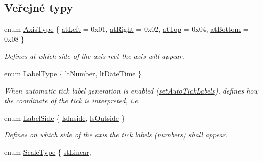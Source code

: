 \subsection*{Veřejné typy}
\begin{DoxyCompactItemize}
\item 
enum \hyperlink{classQCPAxis_ae2bcc1728b382f10f064612b368bc18a}{Axis\+Type} \{ \hyperlink{classQCPAxis_ae2bcc1728b382f10f064612b368bc18aaf84aa6cac6fb6099f54a2cbf7546b730}{at\+Left} = 0x01, 
\hyperlink{classQCPAxis_ae2bcc1728b382f10f064612b368bc18aadf5509f7d29199ef2f263b1dd224b345}{at\+Right} = 0x02, 
\hyperlink{classQCPAxis_ae2bcc1728b382f10f064612b368bc18aac0ece2b680d3f545e701f75af1655977}{at\+Top} = 0x04, 
\hyperlink{classQCPAxis_ae2bcc1728b382f10f064612b368bc18aa220d68888516b6c3b493d144f1ba438f}{at\+Bottom} = 0x08
 \}\begin{DoxyCompactList}\small\item\em Defines at which side of the axis rect the axis will appear. \end{DoxyCompactList}
\item 
enum \hyperlink{classQCPAxis_a4a7da0166f755f5abac23b765d184cad}{Label\+Type} \{ \hyperlink{classQCPAxis_a4a7da0166f755f5abac23b765d184cada7f1eacf3b73adaefd334bea04e094b7e}{lt\+Number}, 
\hyperlink{classQCPAxis_a4a7da0166f755f5abac23b765d184cadafc70594a9d877124dd11ccc187d4ac52}{lt\+Date\+Time}
 \}\begin{DoxyCompactList}\small\item\em When automatic tick label generation is enabled (\hyperlink{classQCPAxis_aaa47e3a6bac0c20d4beb9028f01bc1a1}{set\+Auto\+Tick\+Labels}), defines how the coordinate of the tick is interpreted, i.\+e. \end{DoxyCompactList}
\item 
enum \hyperlink{classQCPAxis_a24b13374b9b8f75f47eed2ea78c37db9}{Label\+Side} \{ \hyperlink{classQCPAxis_a24b13374b9b8f75f47eed2ea78c37db9aae7b027ac2839cf4ad611df30236fc3f}{ls\+Inside}, 
\hyperlink{classQCPAxis_a24b13374b9b8f75f47eed2ea78c37db9a2eadb509fc0c9a8b35b85c86ec9f3c7a}{ls\+Outside}
 \}\begin{DoxyCompactList}\small\item\em Defines on which side of the axis the tick labels (numbers) shall appear. \end{DoxyCompactList}
\item 
enum \hyperlink{classQCPAxis_a36d8e8658dbaa179bf2aeb973db2d6f0}{Scale\+Type} \{ \hyperlink{classQCPAxis_a36d8e8658dbaa179bf2aeb973db2d6f0aff6e30a11a828bc850caffab0ff994f6}{st\+Linear}, 

\end{DoxyCompactItemize}
